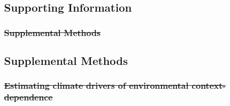 \documentclass[lineno,sn-nature]{sn-jnl}%
\providecommand{\DIFadd}[1]{{\protect\color{blue}#1}} %
\providecommand{\DIFdel}[1]{{\protect\color{red}\protect\scriptsize\sout{#1}}}
\providecommand{\DIFadd}[1]{{\protect\color{blue}\uwave{#1}}} %
\providecommand{\DIFdel}[1]{{\protect\color{red}\sout{#1}}}                      %
\providecommand{\DIFaddbegin}{} %
\providecommand{\DIFaddend}{} %
\providecommand{\DIFdelbegin}{} %
\providecommand{\DIFdelend}{} %
\newcommand{\DIFscaledelfig}{0.5}
\newlength{\DIFdelgraphicswidth} %
\newlength{\DIFdelgraphicsheight} %
\newcommand{\DIFaddincludegraphics}[2][]{{\color{blue}\fbox{\DIFOincludegraphics[#1]{#2}}}} %
\newcommand{\DIFdelincludegraphics}[2][]{%
\sbox{\DIFdelgraphicsbox}{\DIFOincludegraphics[#1]{#2}}%
\settoboxwidth{\DIFdelgraphicswidth}{\DIFdelgraphicsbox} %
\settoboxtotalheight{\DIFdelgraphicsheight}{\DIFdelgraphicsbox} %
\scalebox{\DIFscaledelfig}{%
\parbox[b]{\DIFdelgraphicswidth}{\usebox{\DIFdelgraphicsbox}\\[-\baselineskip] \rule{\DIFdelgraphicswidth}{0em}}\llap{\resizebox{\DIFdelgraphicswidth}{\DIFdelgraphicsheight}{%
\setlength{\unitlength}{\DIFdelgraphicswidth}%
\begin{picture}(1,1)%
\thicklines\linethickness{2pt} %
{\color[rgb]{1,0,0}\put(0,0){\framebox(1,1){}}}%
{\color[rgb]{1,0,0}\put(0,0){\line( 1,1){1}}}%
{\color[rgb]{1,0,0}\put(0,1){\line(1,-1){1}}}%
\end{picture}%
}\hspace*{3pt}}} %
} %
\DeclareRobustCommand{\DIFaddbegin}{\DIFOaddbegin \let\includegraphics\DIFaddincludegraphics} %
\DeclareRobustCommand{\DIFaddend}{\DIFOaddend \let\includegraphics\DIFOincludegraphics} %
\DeclareRobustCommand{\DIFdelbegin}{\DIFOdelbegin \let\includegraphics\DIFdelincludegraphics} %
\DeclareRobustCommand{\DIFdelend}{\DIFOaddend \let\includegraphics\DIFOincludegraphics} %
\begin{document}
\begin{appendices}

\section*{Supporting Information}\label{secA}

\DIFdelbegin \subsubsection*{\DIFdel{Supplemental Methods}}

\DIFdelend \DIFaddbegin \subsection*{\DIFadd{Supplemental Methods}}
\renewcommand\theequation{S\arabic{equation}}   

\DIFaddend 

	\DIFdelbegin \subsubsection*{\DIFdel{Estimating climate drivers of environmental context-dependence}}%


\end{appendices}
\end{document}
